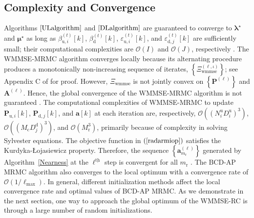 \documentclass[10pt,journal]{IEEEtran}
\newcommand{\paren}[1]{\left({#1}\right)}
\newcommand{\bracket}[1]{{\left [{#1}\right ]}}
\newcommand{\braces}[1]{{\left\{ {#1}\right\}}}
\newcommand{\ith}[1]    {{#1}^{\underline{\text{th}}}}
\newcommand{\rr}{_\mathrm{r}}
\newcommand{\PiB}{\mathbf{P}_{\textrm{u},i}\bracket{k}}
\newcommand{\PBj}{\mathbf{P}_{\textrm{d},j}\bracket{k}}
\newcommand{\sfrac}[2]{#1/#2}
\theoremstyle{definition}
\begin{document}
\subsection{Complexity and Convergence}
Algorithms $\ref{ULalgorithm}$ and $\ref{DLalgorithm}$ are guaranteed to converge to $\boldsymbol{\lambda}^\star$ and $\boldsymbol{\mu}^\star$ as long as $\beta^{\paren{t}}_{\textrm{u},i}\bracket{k}$, $\beta^{\paren{t}}_{\textrm{d}}\bracket{k}$, $\varepsilon^{\paren{t}}_{\textrm{u},i}\bracket{k}$, and $\varepsilon^{\paren{t}}_{\textrm{d},j}\bracket{k}$ are sufficiently small; their computational complexities are $\mathcal{O}\paren{\mathit{I}}$ and $\mathcal{O}\paren{\mathit{J}}$, respectively \cite{Lui2006subg}. The WMMSE-MRMC algorithm converges locally because its alternating procedure produces a monotonically non-increasing sequence of iterates, $\braces{\Xi^{\paren{\ell,\iota}}_{\textrm{wmmse}}}$; see Appendix C of \cite{Luo2011IterativeWMMSE} for proof. However, $\Xi_{\textrm{wmmse}}$ is not jointly convex on $\braces{\mathbf{P}^{\paren{\ell}}}$ and $\mathbf{A}^{\paren{\ell}}$. Hence, the global convergence of the WMMSE-MRMC algorithm is not guaranteed \cite{Luo2011IterativeWMMSE,FD_WMMSE}. The computational complexities of WMMSE-MRMC to update $\PiB$, $\PBj$, and $\mathbf{a}\bracket{k}$ at each iteration are, respectively, $\mathcal{O}\paren{\paren{N^\textrm{u}_iD^\textrm{u}_{i}}^3}$, $\mathcal{O}\paren{\paren{M_{\textrm{c}}D^\textrm{d}_{j}}^3}$, and $\mathcal{O}\paren{M_{\textrm{r}}^3}$, primarily because of complexity in solving Sylvester equations. The objective function in $\paren{\ref{radarmiop}}$ satisfies the Kurdyka-\L ojasiewicz property. Therefore, the sequence $\braces{\mathbf{a}^{\paren{\ell}}_{m\rr}}$ generated by Algorithm~\ref{Nearness} at the $\ith{\ell}$ step is convergent for all $m\rr$ \cite{arXiv180203889Z}. The BCD-AP MRMC algorithm also converges to the local optimum with a convergence rate of $\mathcal{O}\paren{\sfrac{1}{\mathrm{\ell}_{\textrm{max}}}}$\cite{BCDconvergence}. 
In general, different initialization methods affect the local convergence rate and optimal values of BCD-AP MRMC. As we demonstrate in the next section, one way to approach the global optimum of the WMMSE-RC is through a large number of random initializations\cite{Luo2011IterativeWMMSE}.
\end{document}
